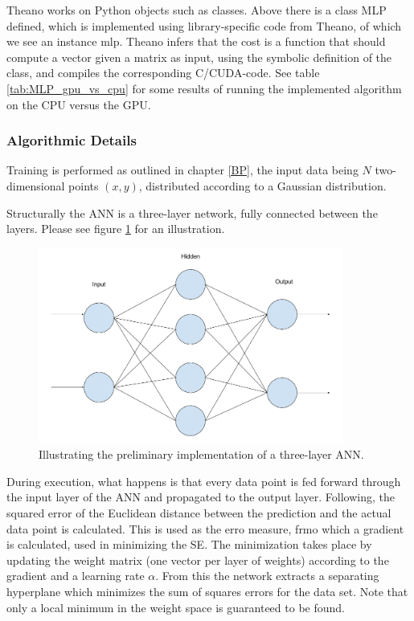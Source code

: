 Theano works on Python objects such as classes. Above there is a class MLP defined, which is implemented using library-specific code from Theano, of which we see an instance mlp. Theano infers that the cost is a function that should compute a vector given a matrix as input, using the symbolic definition of the class, and compiles the corresponding C/CUDA-code. See table \ref{tab:MLP_gpu_vs_cpu} for some results of running the implemented algorithm on the CPU versus the GPU.


\subsubsection{Algorithmic Details}
Training is performed as outlined in chapter \ref{BP}, the input data being $N$ two-dimensional points $(x, y)$, distributed according to a Gaussian distribution.

Structurally the ANN is a three-layer network, fully connected between the layers. Please see figure \ref{fig:MLP_demo} for an illustration.

\begin{figure}
\centering
\includegraphics[width=10cm]{fig/MLP_demo}
\caption{Illustrating the preliminary implementation of a three-layer ANN.}
\label{fig:MLP_demo}
\end{figure}

During execution, what happens is that every data point is fed forward through the input layer of the ANN and propagated to the output layer. Following, the squared error of the Euclidean distance between the prediction and the actual data point is calculated. This is used as the erro measure, frmo which a gradient is calculated, used in minimizing the SE. The minimization takes place by updating the weight matrix (one vector per layer of weights) according to the gradient and a learning rate $\alpha$. From this the network extracts a separating hyperplane which minimizes the sum of squares errors for the data set. Note that only a local minimum in the weight space is guaranteed to be found.

